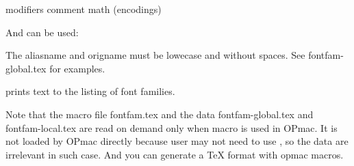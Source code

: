  {modifiers} {comment} {math} (encodings) {}

And \famalias can be used:


The aliasname and origname must be lowecase and without spaces. See
fontfam-global.tex for examples.

 prints text to the listing of font families.

Note that the macro file fontfam.tex and the data fontfam-global.tex and
fontfam-local.tex are read on demand only when \fontfam macro is used in
OPmac. It is not loaded by OPmac directly because user may not need to use
\fontfam, so the data are irrelevant in such case. And you can generate
a TeX format with opmac macros.  
